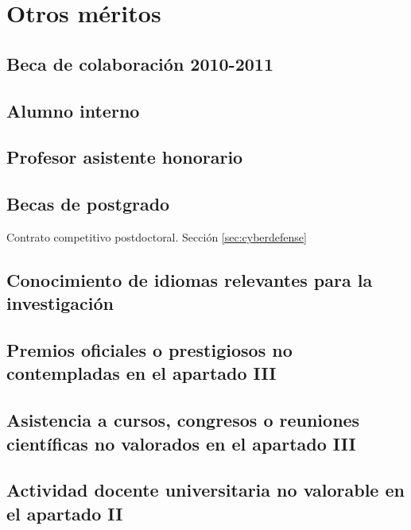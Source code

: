 \section{Otros méritos}

\subsection{Beca de colaboración 2010-2011}

\subsection{Alumno interno}

\subsection{Profesor asistente honorario}

\subsection{Becas de postgrado}
\label{competitivo}
Contrato competitivo postdoctoral. Sección \ref{sec:cyberdefense}

\subsection{Conocimiento de idiomas relevantes para la investigación}
\startitems
{} 
\stopitems

\subsection{Premios oficiales o prestigiosos no contempladas en el apartado III}
\label{sec:premiostesis}

\subsection{Asistencia a cursos, congresos o reuniones científicas no valorados en el apartado III}
 
\subsection{Actividad docente universitaria no valorable en el apartado II}
\label{sec:docenciaingles}

